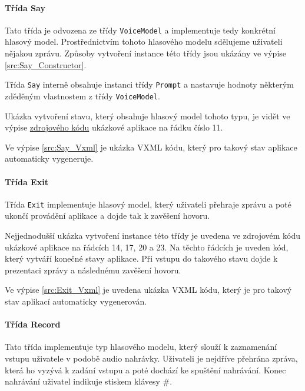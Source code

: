 \documentclass[ing,male,java,dept460]{diploma}						%
\begin{document}
\paragraph{Třída Say}
\label{sec:Say}
Tato třída je odvozena ze třídy \texttt{VoiceModel} a implementuje tedy konkrétní hlasový model. Prostřednictvím tohoto hlasového modelu sdělujeme uživateli nějakou zprávu. Způsoby vytvoření instance této třídy jsou ukázány ve výpise \ref{src:Say_Constructor}.



Třída \texttt{Say} interně obsahuje instanci třídy \texttt{Prompt} a nastavuje hodnoty některým zděděným vlastnostem z třídy \texttt{VoiceModel}.

Ukázka vytvoření stavu, který obsahuje hlasový model tohoto typu, je vidět ve výpise \hyperref[src:MenuExample]{zdrojového kódu} ukázkové aplikace na řádku číslo 11.

Ve výpise \ref{src:Say_Vxml} je ukázka VXML kódu, který pro takový stav aplikace automaticky vygeneruje.



\paragraph{Třída Exit}
\label{sec:Exit}
Třída \texttt{Exit} implementuje hlasový model, který uživateli přehraje zprávu a poté ukončí provádění aplikace a dojde tak k zavěšení hovoru.

Nejjednodušší ukázka vytvoření instance této třídy je uvedena ve zdrojovém kódu ukázkové aplikace na řádcích 14, 17, 20 a 23. Na těchto řádcích je uveden kód, který vytváří konečné stavy aplikace. Při vstupu do takového stavu dojde k prezentaci zprávy a následnému zavěšení hovoru.

Ve výpise \ref{src:Exit_Vxml} je uvedena ukázka VXML kódu, který je pro takový stav aplikací automaticky vygenerován.



\paragraph{Třída Record}
\label{sec:Record}
Tato třída implementuje typ hlasového modelu, který slouží k zaznamenání vstupu uživatele v podobě audio nahrávky. Uživateli je nejdříve přehrána zpráva, která ho vyzývá k zadání vstupu a poté dochází ke spuštění nahrávání. Konec nahrávání uživatel indikuje stiskem klávesy \#.
\end{document}
